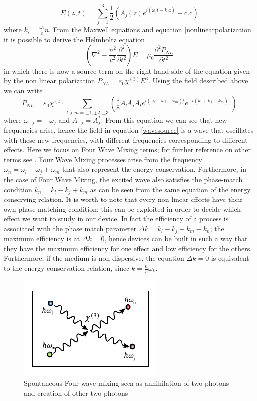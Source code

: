 \documentclass[12pt]{book}
\begin{document}
\begin{equation}E(z,t) = \sum_{j=1}^{3} \frac{1}{2}(A_j(z)e^{i(\omega_jt -k_jz)}+\text{c.c})\end{equation}
where $k_i = \frac{\omega_i}{c}n$. From the Maxwell equations and equation \eqref{nonlinearpolarization} it is possible to derive the Helmholtz equation
\begin{equation}\label{wavesource}\left(\nabla^2 - \frac{n^2}{c^2}\frac{\partial^2}{\partial t^2}\right)E = \mu_0\frac{\partial^2 P_{NL}}{\partial t^2}\end{equation}
in which there is now a source term on the right hand side of the equation given by the non linear polarization $P_{NL} = \varepsilon_0\chi^{(3)}E^3$. Using the field described above we can write
\begin{equation}P_{NL} = \varepsilon_0\chi^{(3)} \sum_{l,j,m=\pm1,\pm2,\pm3}\left(\frac{1}{8}A_lA_jA_l e^{i(\omega_l+\omega_j+\omega_m)t}e^{-i(k_l+k_j+k_m)z}\right)\end{equation}
where $\omega_{-j} = -\omega_j$ and $A_{-j} = A^*_j$. From this equation we can see that new frequencies arise, hence the field in equation \eqref{wavesource} is a wave that oscillates with these new frequencies, with different frequencies corresponding to different effects. Here we focus on Four Wave Mixing terms; for further reference on other terms see \cite{Leuthold2010}. Four Wave Mixing processes arise from the frequency $\omega_n = \omega_l - \omega_j +\omega_m$ that also represent the energy conservation. Furthermore, in the case of Four Wave Mixing, the excited wave also satisfies the phase-match condition $k_n = k_l - k_j + k_m$ as can be seen from the same equation of the energy conserving relation. It is worth to note that every non linear effects have their own phase matching condition; this can be exploited in order to decide which effect we want to study in our device. In fact the efficiency of a process is associated with the phase match parameter \cite{phdthesis:borghi} $\Delta k = k_l - k_j + k_m -k_n$; the maximum efficiency is at $\Delta k = 0$, hence devices can be built in such a way that they have the maximum efficiency for one effect and low efficiency for the others. Furthermore, if the medium is non dispersive, the equation $\Delta k = 0$ is equivalent to the energy conservation relation, since $k = \frac{n}{c}\omega_k$.\\
\begin{figure}
\centering
\includegraphics[width = .4\textwidth]{img/FWMphotons2}
\caption{Spontaneous Four wave mixing seen as annihilation of two photons and creation of other two photons}
\end{figure}
\end{document}
